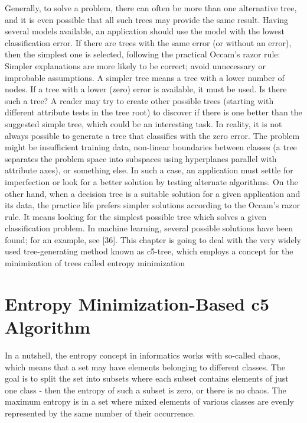 \documentclass[11pt,openany,executivepaper]{book}
\begin{document}
Generally, to solve a problem, there can often be more than one alternative
tree, and it is even possible that all such trees may provide the same result. Having several models available, an application should use the model with the lowest
classification error. If there are trees with the same error (or without an error),
then the simplest one is selected, following the practical Occam’s razor rule:
Simpler explanations are more likely to be correct; avoid unnecessary or improbable assumptions. A simpler tree means a tree with a lower number of nodes.
If a tree with a lower (zero) error is available, it must be used. Is there such
a tree? A reader may try to create other possible trees (starting with different
attribute tests in the tree root) to discover if there is one better than the suggested
simple tree, which could be an interesting task.
In reality, it is not always possible to generate a tree that classifies with the
zero error. The problem might be insufficient training data, non-linear boundaries between classes (a tree separates the problem space into subspaces using
hyperplanes parallel with attribute axes), or something else.
In such a case, an application must settle for imperfection or look for a better
solution by testing alternate algorithms. On the other hand, when a decision tree
is a suitable solution for a given application and its data, the practice life prefers
simpler solutions according to the Occam’s razor rule. It means looking for the
simplest possible tree which solves a given classification problem. In machine
learning, several possible solutions have been found; for an example, see [36].
This chapter is going to deal with the very widely used tree-generating method
known as c5-tree, which employs a concept for the minimization of trees called
entropy minimization

\section{Entropy Minimization-Based c5 Algorithm}

In a nutshell, the entropy concept in informatics works with so-called chaos,
which means that a set may have elements belonging to different classes. The
goal is to split the set into subsets where each subset contains elements of just
one class - then the entropy of such a subset is zero, or there is no chaos. The
maximum entropy is in a set where mixed elements of various classes are evenly
represented by the same number of their occurrence.
\end{document}
